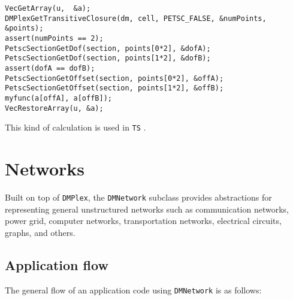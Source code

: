 {\begin{lstlisting}
VecGetArray(u,  &a);
DMPlexGetTransitiveClosure(dm, cell, PETSC_FALSE, &numPoints, &points);
assert(numPoints == 2);
PetscSectionGetDof(section, points[0*2], &dofA);
PetscSectionGetDof(section, points[1*2], &dofB);
assert(dofA == dofB);
PetscSectionGetOffset(section, points[0*2], &offA);
PetscSectionGetOffset(section, points[1*2], &offB);
myfunc(a[offA], a[offB]);
VecRestoreArray(u, &a);
\end{lstlisting}
This kind of calculation is used in \lstinline{TS} \href{http://www.mcs.anl.gov/petsc/petsc-current/src/ts/examples/tutorials/ex11.c.html}{}.

\section{Networks}
Built on top of \lstinline{DMPlex}, the \lstinline{DMNetwork} subclass provides abstractions for representing general unstructured
networks such as communication networks, power grid, computer networks, transportation networks, electrical circuits, graphs, and others.

\subsection{Application flow}
The general flow of an application code using \lstinline{DMNetwork} is as follows:

}
